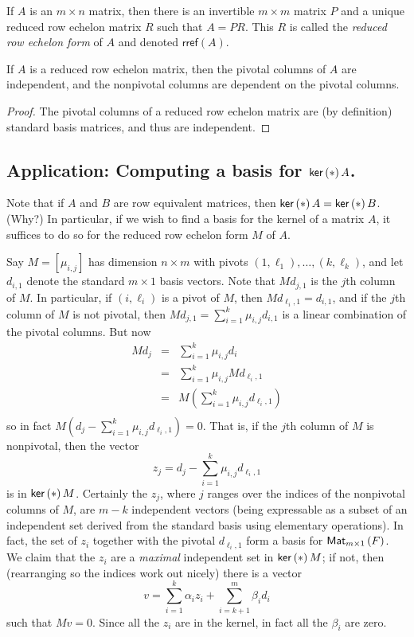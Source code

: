 \documentclass{memoir}
\begin{document}
\begin{cor}
If $A$ is an $m \times n$ matrix, then there is an invertible $m \times m$ matrix $P$ and a unique reduced row echelon matrix $R$ such that $A = PR$. This $R$ is called the \emph{reduced row echelon form} of $A$ and denoted $\mathsf{rref}(A)$.
\end{cor}

\begin{prp}
If $A$ is a reduced row echelon matrix, then the pivotal columns of $A$ are independent, and the nonpivotal columns are dependent on the pivotal columns.
\end{prp}

\begin{proof}
The pivotal columns of a reduced row echelon matrix are (by definition) standard basis matrices, and thus are independent.
\end{proof}

\subsection*{Application: Computing a basis for $\operatorname{\mathsf{ker}}\left(*\right){A}$.}
Note that if $A$ and $B$ are row equivalent matrices, then $\operatorname{\mathsf{ker}}\left(*\right){A} = \operatorname{\mathsf{ker}}\left(*\right){B}$. (Why?) In particular, if we wish to find a basis for the kernel of a matrix $A$, it suffices to do so for the reduced row echelon form $M$ of $A$.

Say $M = [\mu_{i,j}]$ has dimension $n \times m$ with pivots $(1,\ell_1), \ldots, (k,\ell_k)$, and let $d_{i,1}$ denote the standard $m \times 1$ basis vectors. Note that $Md_{j,1}$ is the $j$th column of $M$. In particular, if $(i,\ell_i)$ is a pivot of $M$, then $Md_{\ell_i,1} = d_{i,1}$, and if the $j$th column of $M$ is not pivotal, then $Md_{j,1} = \sum_{i=1}^k \mu_{i,j} d_{i,1}$ is a linear combination of the pivotal columns. But now 
\begin{eqnarray*}
Md_j & = & \sum_{i=1}^k \mu_{i,j} d_i \\
     & = & \sum_{i=1}^k \mu_{i,j} Md_{\ell_i,1} \\
     & = & M(\sum_{i=1}^k \mu_{i,j} d_{\ell_i,1}) \\
\end{eqnarray*}
so in fact $M(d_j - \sum_{i=1}^k \mu_{i,j} d_{\ell_i,1}) = 0$. That is, if the $j$th column of $M$ is nonpivotal, then the vector \[ z_j = d_j - \sum_{i=1}^k \mu_{i,j} d_{\ell_i,1} \] is in $\operatorname{\mathsf{ker}}\left(*\right){M}$. Certainly the $z_j$, where $j$ ranges over the indices of the nonpivotal columns of $M$, are $m-k$ independent vectors (being expressable as a subset of an independent set derived from the standard basis using elementary operations). In fact, the set of $z_i$ together with the pivotal $d_{\ell_i,1}$ form a basis for ${\mathsf{Mat}_{{m} \times {1}}}\left(F\right)$. We claim that the $z_i$ are a \emph{maximal} independent set in $\operatorname{\mathsf{ker}}\left(*\right){M}$; if not, then (rearranging so the indices work out nicely) there is a vector \[ v = \sum_{i=1}^k \alpha_i z_i + \sum_{i=k+1}^m \beta_i d_i \] such that $Mv = 0$. Since all the $z_i$ are in the kernel, in fact all the $\beta_i$ are zero.
\end{document}
